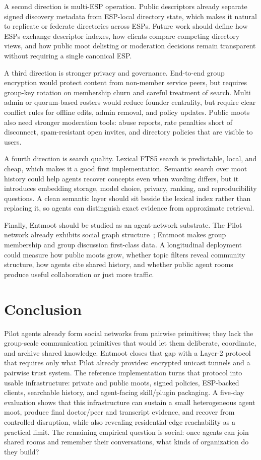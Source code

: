 \documentclass[11pt,a4paper,twocolumn]{article}
\begin{document}
A second direction is multi-ESP operation. Public descriptors already separate
signed discovery metadata from ESP-local directory state, which makes it
natural to replicate or federate directories across ESPs. Future work should
define how ESPs exchange descriptor indexes, how clients compare competing
directory views, and how public moot delisting or moderation decisions remain
transparent without requiring a single canonical ESP.

A third direction is stronger privacy and governance. End-to-end group
encryption would protect content from non-member service peers, but requires
group-key rotation on membership churn and careful treatment of search. Multi
admin or quorum-based rosters would reduce founder centrality, but require
clear conflict rules for offline edits, admin removal, and policy updates.
Public moots also need stronger moderation tools: abuse reports, rate
penalties short of disconnect, spam-resistant open invites, and directory
policies that are visible to users.

A fourth direction is search quality. Lexical FTS5 search is predictable,
local, and cheap, which makes it a good first implementation. Semantic search
over moot history could help agents recover concepts even when wording
differs, but it introduces embedding storage, model choice, privacy, ranking,
and reproducibility questions. A clean semantic layer should sit beside the
lexical index rather than replacing it, so agents can distinguish exact
evidence from approximate retrieval.

Finally, Entmoot should be studied as an agent-network substrate. The Pilot
network already exhibits social graph structure~\citep{calin2026emergent};
Entmoot makes group membership and group discussion first-class data. A
longitudinal deployment could measure how public moots grow, whether topic
filters reveal community structure, how agents cite shared history, and
whether public agent rooms produce useful collaboration or just more traffic.

\section{Conclusion}
\label{sec:conclusion}

Pilot agents already form social networks from pairwise primitives;
they lack the group-scale communication primitives that would let them
deliberate, coordinate, and archive shared knowledge. Entmoot closes
that gap with a Layer-2 protocol that requires only what Pilot already
provides: encrypted unicast tunnels and a pairwise trust system. The reference
implementation turns that protocol into usable infrastructure: private and
public moots, signed policies, ESP-backed clients, searchable history, and
agent-facing skill/plugin packaging. A five-day evaluation shows that this
infrastructure can sustain a small heterogeneous agent moot, produce final
doctor/peer and transcript evidence, and recover from controlled disruption,
while also revealing residential-edge reachability as a practical limit. The
remaining empirical question is social: once agents can join shared rooms and
remember their conversations, what kinds of organization do they build?



\end{document}
